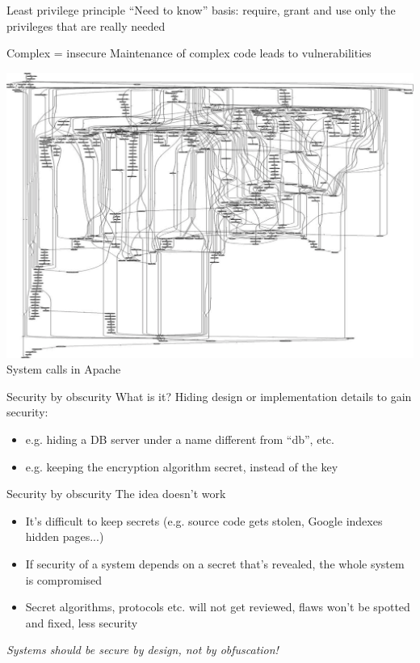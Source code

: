 \documentclass{beamer}
\begin{document}
\begin{frame}{Least privilege principle}
“Need to know” basis: require, grant and use only the privileges that are really needed
\end{frame}

\begin{frame}{Complex = insecure}
Maintenance of complex code leads to vulnerabilities
\begin{center}
\includegraphics[width=0.6\linewidth]{complex.png} \newline
System calls in Apache
\end{center}
\end{frame}

\begin{frame}{Security by obscurity}
What is it? Hiding design or implementation details to gain security:
\begin{itemize}
\item e.g. hiding a DB server under a name different from “db”, etc.
\item e.g. keeping the encryption algorithm secret, instead of the key
\end{itemize}
\end{frame}

\begin{frame}{Security by obscurity}
The idea doesn’t work
\begin{itemize}
\item It’s difficult to keep secrets (e.g. source code gets stolen, Google indexes hidden pages...)
\item If security of a system depends on a secret that's revealed, the whole system is compromised
\item Secret algorithms, protocols etc. will not get reviewed, flaws won’t be spotted and fixed, less security
\end{itemize}
\centering
{ \color{red} \textit{Systems should be secure by design, not by obfuscation!} }
\end{frame}
\end{document}
